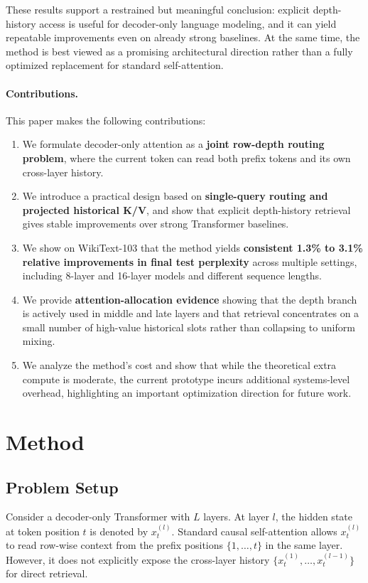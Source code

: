 \documentclass[11pt]{article}
\begin{document}
These results support a restrained but meaningful conclusion: explicit depth-history access is useful for decoder-only language modeling, and it can yield repeatable improvements even on already strong baselines. At the same time, the method is best viewed as a promising architectural direction rather than a fully optimized replacement for standard self-attention.

\paragraph{Contributions.}
This paper makes the following contributions:
\begin{enumerate}[leftmargin=1.5em]
    \item We formulate decoder-only attention as a \textbf{joint row-depth routing problem}, where the current token can read both prefix tokens and its own cross-layer history.
    \item We introduce a practical design based on \textbf{single-query routing and projected historical K/V}, and show that explicit depth-history retrieval gives stable improvements over strong Transformer baselines.
    \item We show on WikiText-103 that the method yields \textbf{consistent 1.3\% to 3.1\% relative improvements in final test perplexity} across multiple settings, including 8-layer and 16-layer models and different sequence lengths.
    \item We provide \textbf{attention-allocation evidence} showing that the depth branch is actively used in middle and late layers and that retrieval concentrates on a small number of high-value historical slots rather than collapsing to uniform mixing.
    \item We analyze the method's cost and show that while the theoretical extra compute is moderate, the current prototype incurs additional systems-level overhead, highlighting an important optimization direction for future work.
\end{enumerate}

\section{Method}

\subsection{Problem Setup}

Consider a decoder-only Transformer with $L$ layers. At layer $l$, the hidden state at token position $t$ is denoted by $x_t^{(l)}$. Standard causal self-attention allows $x_t^{(l)}$ to read row-wise context from the prefix positions $\{1, \dots, t\}$ in the same layer. However, it does not explicitly expose the cross-layer history $\{x_t^{(1)}, \dots, x_t^{(l-1)}\}$ for direct retrieval.
\end{document}
